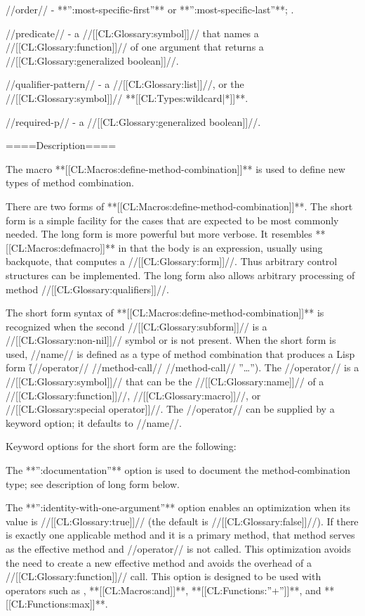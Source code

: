 //order// - **'':most-specific-first''** or **'':most-specific-last''**; \eval.

//predicate// - a //[[CL:Glossary:symbol]]// that names a //[[CL:Glossary:function]]// of one argument that returns a //[[CL:Glossary:generalized boolean]]//.

//qualifier-pattern// - a //[[CL:Glossary:list]]//, or the //[[CL:Glossary:symbol]]// **[[CL:Types:wildcard|*]]**.

//required-p// - a //[[CL:Glossary:generalized boolean]]//.

====Description====

The macro **[[CL:Macros:define-method-combination]]** is used to define new types of method combination.

There are two forms of **[[CL:Macros:define-method-combination]]**. The short form is a simple facility for the cases that are expected to be most commonly needed. The long form is more powerful but more verbose. It resembles **[[CL:Macros:defmacro]]** in that the body is an expression, usually using backquote, that computes a //[[CL:Glossary:form]]//. Thus arbitrary control structures can be implemented. The long form also allows arbitrary processing of method //[[CL:Glossary:qualifiers]]//.




\beginlist {}

The short form syntax of **[[CL:Macros:define-method-combination]]** is recognized when the second //[[CL:Glossary:subform]]// is a //[[CL:Glossary:non-nil]]// symbol or is not present. When the short form is used, //name// is defined as a type of method combination that produces a Lisp form \f{({//operator// //method-call// //method-call// ''\ldots''})}. The //operator// is a //[[CL:Glossary:symbol]]// that can be the //[[CL:Glossary:name]]// of a //[[CL:Glossary:function]]//, //[[CL:Glossary:macro]]//, or //[[CL:Glossary:special operator]]//. The //operator// can be supplied by a keyword option; it defaults to //name//.

Keyword options for the short form are the following:

\beginlist

\itemitem{\bull} The **'':documentation''** option is used to document the method-combination type; see description of long form below.

\itemitem{\bull} The **'':identity-with-one-argument''** option enables an optimization when its value is //[[CL:Glossary:true]]// (the default is //[[CL:Glossary:false]]//). If there is exactly one applicable method and it is a primary method, that method serves as the effective method and //operator// is not called. This optimization avoids the need to create a new effective method and avoids the overhead of a //[[CL:Glossary:function]]// call. This option is designed to be used with operators such as , **[[CL:Macros:and]]**, **[[CL:Functions:''+'']]**, and **[[CL:Functions:max]]**.

